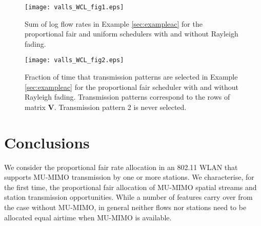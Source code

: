 \documentclass[11pt]{amsart}
\def\m#1{\mathbf{#1}}
\begin{document}
\begin{figure}
\centering
\texttt{[image: valls\_WCL\_fig1.eps]}
\caption{Sum of log flow rates in Example \ref{sec:exampleac} for the proportional fair and uniform schedulers with and without Rayleigh fading.}
\label{fig:rate}
\end{figure}

\begin{figure}
\centering
\texttt{[image: valls\_WCL\_fig2.eps]}
\caption{Fraction of time that transmission patterns are selected in Example \ref{sec:exampleac} for the proportional fair scheduler with and without Rayleigh fading. Transmission patterns correspond to the rows of matrix $\m{V}$. Transmission pattern 2 is never selected.}
\label{fig:time}
\end{figure}


\section{Conclusions}
We consider the proportional fair rate allocation in an 802.11 WLAN that supports MU-MIMO transmission by one or more stations.   We characterise, for the first time, the proportional fair allocation of MU-MIMO spatial streams and station transmission opportunities.  While a number of features carry over from the case without MU-MIMO, in general neither flows nor stations need to be allocated equal airtime when MU-MIMO is available.



\end{document}
